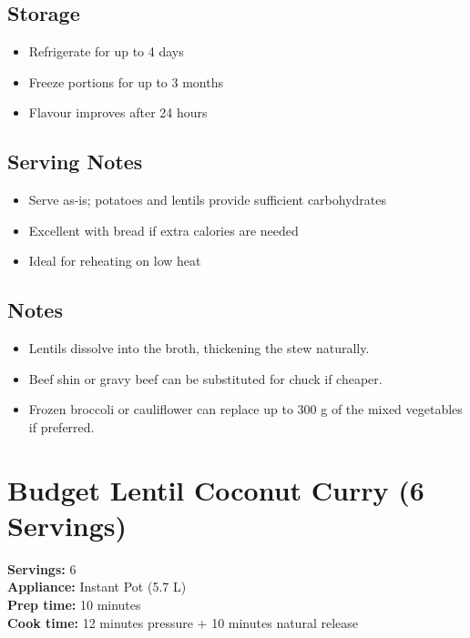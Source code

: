 \documentclass[11pt,a4paper]{article}
\begin{document}
\vspace{0.5em}

\subsection*{Storage}
\begin{itemize}
    \item Refrigerate for up to 4 days
    \item Freeze portions for up to 3 months
    \item Flavour improves after 24 hours
\end{itemize}

\vspace{0.5em}

\subsection*{Serving Notes}
\begin{itemize}
    \item Serve as-is; potatoes and lentils provide sufficient carbohydrates
    \item Excellent with bread if extra calories are needed
    \item Ideal for reheating on low heat
\end{itemize}

\vspace{0.5em}

\subsection*{Notes}
\begin{itemize}
    \item Lentils dissolve into the broth, thickening the stew naturally.
    \item Beef shin or gravy beef can be substituted for chuck if cheaper.
    \item Frozen broccoli or cauliflower can replace up to 300 g of the mixed vegetables if preferred.
\end{itemize}

\section*{Budget Lentil Coconut Curry (6 Servings)}

\textbf{Servings:} 6 \\
\textbf{Appliance:} Instant Pot (5.7 L) \\
\textbf{Prep time:} 10 minutes \\
\textbf{Cook time:} 12 minutes pressure + 10 minutes natural release
\end{document}
